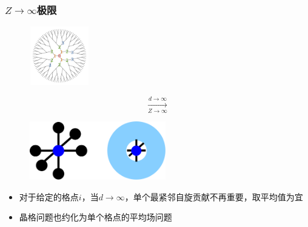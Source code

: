\frame
{
	\frametitle{$Z\rightarrow\infty$极限}
\begin{minipage}[b]{0.25\linewidth}
\begin{figure}[h!]
\centering
\includegraphics[height=1.0in,width=1.05in,viewport=0 0 1980 1980,clip]{Figures/Bethe-Lattice-Ising_Model.png}
\label{Bethe-Lattice_Ising-Model_Limit-1}
\end{figure}
\end{minipage}
\hfill
\begin{minipage}[t]{0.14\linewidth}
	\vspace{-1in} 
	\begin{displaymath}
		\xrightarrow[Z\rightarrow\infty]{d\rightarrow\infty}
	\end{displaymath}
\end{minipage}
\hfill
\begin{minipage}[b]{0.55\linewidth}
\begin{figure}[h!]
\centering
\includegraphics[height=1.0in,width=2.35in,viewport=0 0 1050 455,clip]{Figures/Bethe-Lattice.png}
\label{Bethe-Lattice_Ising-Model_Limit-2}
\end{figure}
\end{minipage}
\begin{itemize}
	\item 对于给定的格点$i$，当$d\rightarrow\infty$，单个最紧邻自旋贡献不再重要，取平均值为宜
	\item 晶格问题也约化为单个格点的平均场问题
\end{itemize}
}

